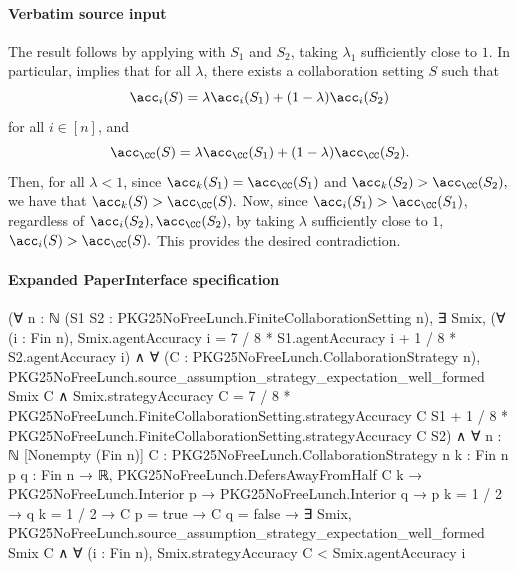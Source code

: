 \documentclass[10pt]{article}
\begin{document}
\paragraph{Verbatim source input}
\begin{ReviewVerbatim}
The result follows by applying  with $S_1$ and $S_2$, taking $\lambda_1$ sufficiently close to $1$. In particular,  implies that for all $\lambda$, there exists a collaboration setting $S$ such that
\begin{equation}
    \acc_i(S) = \lambda \acc_i(S_1) + (1-\lambda) \acc_i(S_2)
\end{equation}
for all $i\in [n]$, and
\begin{equation}
    \acc_\CC(S) = \lambda \acc_\CC(S_1) + (1-\lambda) \acc_\CC(S_2).
\end{equation}
Then, for all $\lambda < 1$, since $\acc_k(S_1)=\acc_\CC(S_1)$ and $\acc_k(S_2)>\acc_\CC(S_2),$ we have that $\acc_k(S) > \acc_\CC(S).$
Now, since $\acc_i(S_1)>\acc_\CC(S_1)$, regardless of $\acc_i(S_2), \acc_\CC(S_2),$ by taking $\lambda$ sufficiently close to $1$, $\acc_i(S) > \acc_\CC(S).$ This provides the desired contradiction.
\end{ReviewVerbatim}


\paragraph{Expanded PaperInterface specification}
\begin{ReviewVerbatim}
(∀ {n : ℕ} (S1 S2 : PKG25NoFreeLunch.FiniteCollaborationSetting n),
    ∃ Smix,
      (∀ (i : Fin n), Smix.agentAccuracy i = 7 / 8 * S1.agentAccuracy i + 1 / 8 * S2.agentAccuracy i) ∧
        ∀ (C : PKG25NoFreeLunch.CollaborationStrategy n),
          PKG25NoFreeLunch.source_assumption_strategy_expectation_well_formed Smix C ∧
            Smix.strategyAccuracy C =
              7 / 8 * PKG25NoFreeLunch.FiniteCollaborationSetting.strategyAccuracy C S1 +
                1 / 8 * PKG25NoFreeLunch.FiniteCollaborationSetting.strategyAccuracy C S2) ∧
  ∀ {n : ℕ} [Nonempty (Fin n)] {C : PKG25NoFreeLunch.CollaborationStrategy n} {k : Fin n} {p q : Fin n → ℝ},
    PKG25NoFreeLunch.DefersAwayFromHalf C k →
      PKG25NoFreeLunch.Interior p →
        PKG25NoFreeLunch.Interior q →
          p k = 1 / 2 →
            q k = 1 / 2 →
              C p = true →
                C q = false →
                  ∃ Smix,
                    PKG25NoFreeLunch.source_assumption_strategy_expectation_well_formed Smix C ∧
                      ∀ (i : Fin n), Smix.strategyAccuracy C < Smix.agentAccuracy i
\end{ReviewVerbatim}
\end{document}
